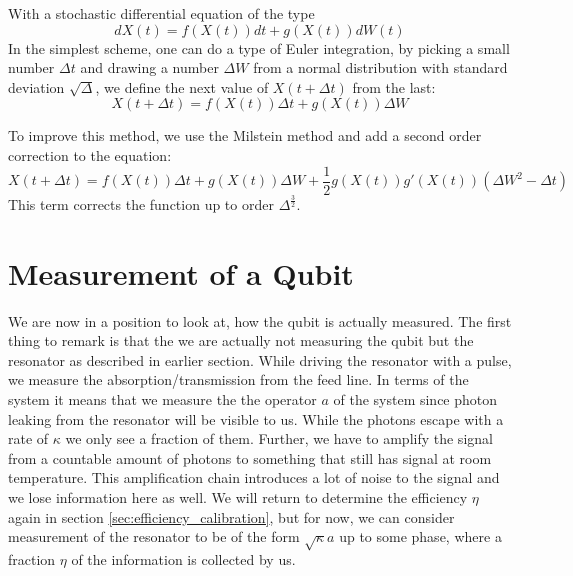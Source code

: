 With a stochastic differential equation of the type 
\begin{equation}\label{eq:stochastic_diff_equation_numerical}
    dX(t) = f(X(t))dt + g(X(t)) dW(t) 
\end{equation}
In the simplest scheme, one can do a type of Euler integration, by picking a small number $\Delta t$ and drawing a number $\Delta W$ from a normal distribution with standard deviation $\sqrt{\Delta}$, we define the next value of $X(t + \Delta t)$ from the last:
\begin{equation}
    X(t + \Delta t) = f(X(t))\Delta t + g(X(t)) \Delta W
\end{equation}

To improve this method, we use the Milstein method and add a second order correction to the equation: 
\begin{equation}
    X(t + \Delta t) = f(X(t))\Delta t + g(X(t)) \Delta W + \frac12 g(X(t))g'(X(t))\left(\Delta W^2 - \Delta t \right)
\end{equation}
This term corrects the function up to order $\Delta^\frac32$.


\section{Measurement of a Qubit}
We are now in a position to look at, how the qubit is actually measured. The first thing to remark is that the we are actually not measuring the qubit but the resonator as described in earlier section. While driving the resonator with a pulse, we measure the absorption/transmission from the feed line. In terms of the system it means that we measure the the operator $a$ of the system since photon leaking from the resonator will be visible to us. While the photons escape with a rate of $\kappa$ we only see a fraction of them. Further, we have to amplify the signal from a countable amount of photons to something that still has signal at room temperature. This amplification chain introduces a lot of noise to the signal and we lose information here as well. We will return to determine the efficiency $\eta$ again in section \ref{sec:efficiency_calibration}, but for now, we can consider measurement of the resonator to be of the form $\sqrt{\kappa}a$ up to some phase, where a fraction $\eta$ of the information is collected by us.

